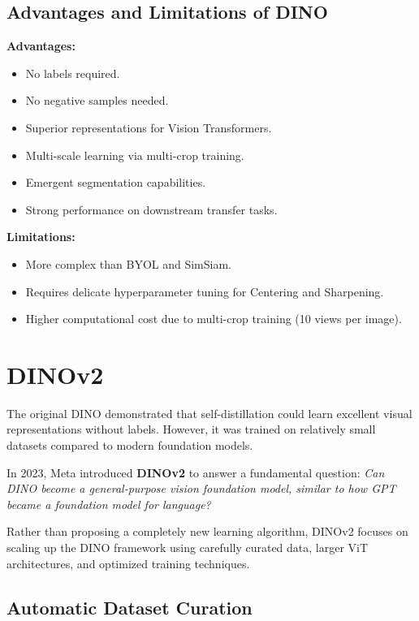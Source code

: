 \subsection{Advantages and Limitations of DINO}

\textbf{Advantages:}
\begin{itemize}
    \item No labels required.
    \item No negative samples needed.
    \item Superior representations for Vision Transformers.
    \item Multi-scale learning via multi-crop training.
    \item Emergent segmentation capabilities.
    \item Strong performance on downstream transfer tasks.
\end{itemize}

\textbf{Limitations:}
\begin{itemize}
    \item More complex than BYOL and SimSiam.
    \item Requires delicate hyperparameter tuning for Centering and Sharpening.
    \item Higher computational cost due to multi-crop training (10 views per image).
\end{itemize}

\section{DINOv2}

The original DINO demonstrated that self-distillation could learn excellent visual representations without labels. However, it was trained on relatively small datasets compared to modern foundation models.

In 2023, Meta introduced \textbf{DINOv2} to answer a fundamental question: \emph{Can DINO become a general-purpose vision foundation model, similar to how GPT became a foundation model for language?}

Rather than proposing a completely new learning algorithm, DINOv2 focuses on scaling up the DINO framework using carefully curated data, larger ViT architectures, and optimized training techniques.

\subsection{Automatic Dataset Curation}

